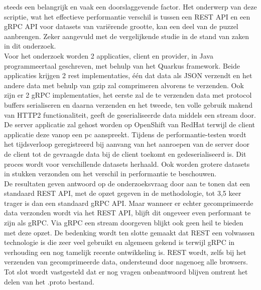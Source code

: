 steeds een belangrijk en vaak een doorslaggevende factor.
Het onderwerp van deze scriptie, wat het effectieve performantie verschil is tussen een REST API en een gRPC API voor
datasets van variërende grootte, kan een deel van de puzzel aanbrengen. Zeker aangevuld met de vergelijkende studie in de stand van zaken in dit onderzoek.\\
Voor het onderzoek worden 2 applicaties, client en provider, in Java programmeertaal geschreven, met behulp van het Quarkus framework.
Beide applicaties krijgen 2 rest implementaties, één dat data als JSON verzendt en het andere data met behulp van gzip zal comprimeren alvorens te verzenden.
Ook zijn er 2 gRPC implementaties, het eerste zal de te verzenden data met protocol buffers serialiseren en daarna verzenden en het tweede,
ten volle gebruik makend van HTTP2 functionaliteit, geeft de geserialiseerde data middels een stream door.
De server applicatie zal gehost worden op OpenShift van RedHat terwijl de client applicatie deze vanop een pc aanspreekt.
Tijdens de performantie-testen wordt het tijdsverloop geregistreerd bij aanvang van het aanroepen van de server door de client
tot de gevraagde data bij de client toekomt en gedeserialiseerd is. Dit proces wordt voor verschillende datasets herhaald.
Ook worden grotere datasets in stukken verzonden om het verschil in performantie te beschouwen.\\
De resultaten geven antwoord op de onderzoeksvraag door aan te tonen dat een standaard REST API, met de opzet gegeven in de methodologie,
tot 3,5 keer trager is dan een standaard gRPC API. Maar wanneer er echter gecomprimeerde data verzonden wordt via het REST API, blijft dit ongeveer even performant te zijn als gRPC.
Via gRPC een stream doorgeven blijkt ook geen heil te bieden met deze opzet.
De bedenking wordt ten slotte gemaakt dat REST een volwassen technologie is die zeer veel gebruikt en algemeen gekend is terwijl gRPC in verhouding een nog tamelijk recente ontwikkeling is.
REST wordt, zelfs bij het verzenden van gecomprimeerde data, ondersteund door nagenoeg alle browsers.
Tot slot wordt vastgesteld dat er nog vragen onbeantwoord blijven omtrent het delen van het .proto bestand.